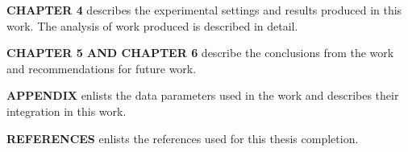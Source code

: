 {{\uppercase{\bf{Chapter 4}}}
    describes the experimental settings and results produced in this work. The analysis of work produced is described in detail.
}

{{\uppercase{\bf{Chapter 5 and Chapter 6}}}
    describe the conclusions from the work and recommendations for future work. 
}

{{\uppercase{\bf{Appendix}}}
     enlists the data parameters used in the work and describes their integration in this work.
}

{{\uppercase{\bf{References}}}
    enlists the references used for this thesis completion.
}